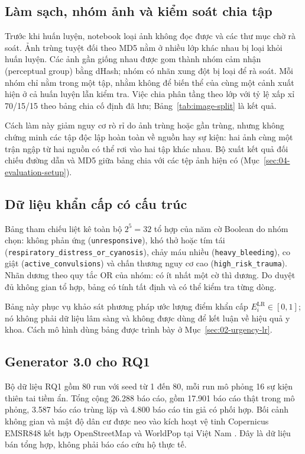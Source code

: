 \subsection{Làm sạch, nhóm ảnh và kiểm soát chia tập}
Trước khi huấn luyện, notebook loại ảnh không đọc được và các thư mục chờ rà soát. Ảnh trùng tuyệt đối theo MD5 nằm ở nhiều lớp khác nhau bị loại khỏi huấn luyện. Các ảnh gần giống nhau được gom thành nhóm cảm nhận (perceptual group) bằng dHash; nhóm có nhãn xung đột bị loại để rà soát. Mỗi nhóm chỉ nằm trong một tập, nhằm không để biến thể của cùng một cảnh xuất hiện ở cả huấn luyện lẫn kiểm tra. Việc chia phân tầng theo lớp với tỷ lệ xấp xỉ 70/15/15 theo bảng chia cố định đã lưu; Bảng~\ref{tab:image-split} là kết quả.

Cách làm này giảm nguy cơ rò rỉ do ảnh trùng hoặc gần trùng, nhưng không chứng minh các tập độc lập hoàn toàn về nguồn hay sự kiện: hai ảnh cùng một trận ngập từ hai nguồn có thể rơi vào hai tập khác nhau. Bộ xuất kết quả đối chiếu đường dẫn và MD5 giữa bảng chia với các tệp ảnh hiện có (Mục~\ref{sec:04-evaluation-setup}).

\subsection{Dữ liệu khẩn cấp có cấu trúc}
Bảng tham chiếu liệt kê toàn bộ $2^5=32$ tổ hợp của năm cờ Boolean do nhóm chọn: không phản ứng (\texttt{unresponsive}), khó thở hoặc tím tái (\texttt{respiratory\_\allowbreak{}distress\_\allowbreak{}or\_\allowbreak{}cyanosis}), chảy máu nhiều (\texttt{heavy\_bleeding}), co giật (\texttt{active\_convulsions}) và chấn thương nguy cơ cao (\texttt{high\_risk\_trauma}). Nhãn dương theo quy tắc OR của nhóm: có ít nhất một cờ thì dương. Do duyệt đủ không gian tổ hợp, bảng có tính tất định và có thể kiểm tra từng dòng.

Bảng này phục vụ khảo sát phương pháp ước lượng điểm khẩn cấp $E_i^{\mathrm{LR}}\in[0,1]$; nó không phải dữ liệu lâm sàng và không được dùng để kết luận về hiệu quả y khoa. Cách mô hình dùng bảng được trình bày ở Mục~\ref{sec:02-urgency-lr}.

\subsection{Generator 3.0 cho RQ1}
Bộ dữ liệu RQ1 gồm 80 run với seed từ 1 đến 80, mỗi run mô phỏng 16 sự kiện thiên tai tiềm ẩn. Tổng cộng 26.288 báo cáo, gồm 17.901 báo cáo thật trong mô phỏng, 3.587 báo cáo trùng lặp và 4.800 báo cáo tin giả có phối hợp. Bối cảnh không gian và mật độ dân cư được neo vào kích hoạt vệ tinh Copernicus EMSR848 kết hợp OpenStreetMap và WorldPop tại Việt Nam \citep{copernicusEMSR848,worldpop2025vietnam}. Đây là dữ liệu bán tổng hợp, không phải báo cáo cứu hộ thực tế.

